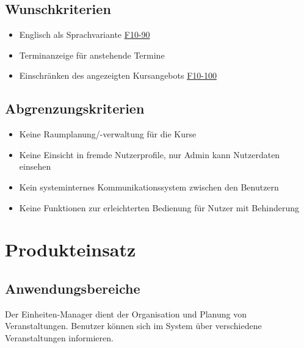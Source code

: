 \documentclass[a4paper]{scrreprt}
\begin{document}
    \section{Wunschkriterien}
			\begin{itemize}
				\item Englisch als Sprachvariante \hyperlink{spracheAendern}{F10-90}
				\item Terminanzeige für anstehende Termine
	     		\item Einschränken des angezeigten Kursangebots \hyperlink{kursEinschraenken}{F10-100}
			\end{itemize}
			
	\section{Abgrenzungskriterien}
     		\begin{itemize}
	     		\item Keine Raumplanung/-verwaltung für die Kurse
	     		\item Keine Einsicht in fremde Nutzerprofile, nur Admin kann Nutzerdaten einsehen
	     		\item Kein systeminternes Kommunikationssystem zwischen den Benutzern
	     		\item Keine Funktionen zur erleichterten Bedienung für Nutzer mit Behinderung
     		\end{itemize}
        
  
\chapter{Produkteinsatz}
    \section{Anwendungsbereiche}
		 Der \gls{Einheiten}-Manager dient der Organisation und Planung von Veranstaltungen. Benutzer können sich im System über verschiedene Veranstaltungen informieren.   
     
\end{document}
